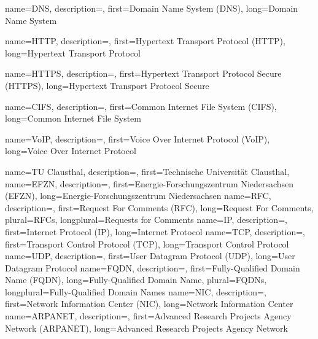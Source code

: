 {%
    name={DNS},
    description={},
    first={Domain Name System (DNS)},
    long={Domain Name System}
}

{%
    name={HTTP},
    description={},
    first={Hypertext Transport Protocol (HTTP)},
    long={Hypertext Transport Protocol}

}
{%
    name={HTTPS},
    description={},
    first={Hypertext Transport Protocol Secure (HTTPS)},
    long={Hypertext Transport Protocol Secure}

}
{%
    name={CIFS},
    description={},
    first={Common Internet File System (CIFS)},
    long={Common Internet File System}

}
{%
    name={VoIP},
    description={},
    first={Voice Over Internet Protocol (VoIP)},
    long={Voice Over Internet Protocol}

}
{%
    name={TU Clausthal},
    description={},
    first={Technische Universität Clausthal},
}
{%
    name={EFZN},
    description={},
    first={Energie-Forschungszentrum Niedersachsen (EFZN)},
    long={Energie-Forschungszentrum Niedersachsen}
}
{%
    name={RFC},
    description={},
    first={Request For Comments (RFC)},
    long={Request For Comments},
    plural={RFCs},
    longplural={Requests for Comments}
}
{%
    name={IP},
    description={},
    first={Internet Protocol (IP)},
    long={Internet Protocol}
}
{%
    name={TCP},
    description={},
    first={Transport Control Protocol (TCP)},
    long={Transport Control Protocol}
}
{%
    name={UDP},
    description={},
    first={User Datagram Protocol (UDP)},
    long={User Datagram Protocol}
}
{%
    name={FQDN},
    description={},
    first={Fully-Qualified Domain Name (FQDN)},
    long={Fully-Qualified Domain Name},
    plural={FQDNs},
    longplural={Fully-Qualified Domain Names}
}
{%
    name={NIC},
    description={},
    first={Network Information Center (NIC)},
    long={Network Information Center}
}
{%
    name={ARPANET},
    description={},
    first={Advanced Research Projects Agency Network (ARPANET)},
    long={Advanced Research Projects Agency Network}
}
